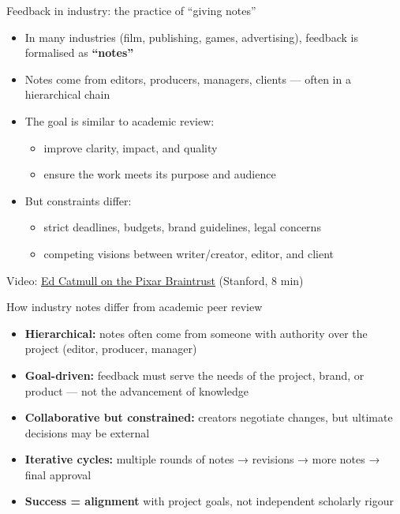 \documentclass[aspectratio=169]{beamer}
\begin{document}
\begin{frame}{Feedback in industry: the practice of ``giving notes''}
\begin{itemize}
  \item In many industries (film, publishing, games, advertising), feedback is formalised as \textbf{``notes''} \citep{catmull2014creativityinc}
  \item Notes come from editors, producers, managers, clients — often in a hierarchical chain
  \item The goal is similar to academic review:
    \begin{itemize}
      \item improve clarity, impact, and quality
      \item ensure the work meets its purpose and audience
    \end{itemize}
  \item But constraints differ:
    \begin{itemize}
      \item strict deadlines, budgets, brand guidelines, legal concerns
      \item competing visions between writer/creator, editor, and client
    \end{itemize}
\end{itemize}

\medskip
\small Video: \href{https://www.youtube.com/watch?v=I1Mr3oKR7oM}{Ed Catmull on the Pixar Braintrust} (Stanford, 8 min) %
\end{frame}

\begin{frame}{How industry notes differ from academic peer review}
\begin{itemize}
  \item \textbf{Hierarchical:} notes often come from someone with authority over the project (editor, producer, manager)
  \item \textbf{Goal-driven:} feedback must serve the needs of the project, brand, or product — not the advancement of knowledge
  \item \textbf{Collaborative but constrained:} creators negotiate changes, but ultimate decisions may be external
  \item \textbf{Iterative cycles:} multiple rounds of notes → revisions → more notes → final approval
  \item \textbf{Success = alignment} with project goals, not independent scholarly rigour
\end{itemize}

\end{frame}
\end{document}
